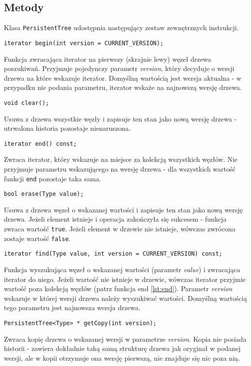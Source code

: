 \documentclass[a4paper,twoside]{article}
\begin{document}
	\subsection{Metody}
	Klasa \lstinline|PersistentTree| udostępnia następujący zestaw zewnętrznych instrukcji.
	\begin{lstlisting}[caption=begin]
iterator begin(int version = CURRENT_VERSION);
	\end{lstlisting}
	Funkcja zwracająca iterator na pierwszy (skrajnie lewy) węzeł drzewa poszukiwań. Przyjmuje pojedynczy parametr \textit{version}, który decyduje o wersji drzewa na które wskazuje iterator. Domyślną wartością jest wersja aktualna - w przypadku nie podania parametru, iterator wskaże na najnowszą wersję drzewa.
	\begin{lstlisting}[caption=clear]
void clear();
	\end{lstlisting}
	Usuwa z drzewa wszystkie węzły i zapisuje ten stan jako nową wersję drzewa - utrwalona historia pozostaje nienaruszona.
	\begin{lstlisting}[caption=end, label={lst:end}]
iterator end() const;
	\end{lstlisting}
	Zwraca iterator, który wskazuje na miejsce za kolekcją wszystkich węzłów. Nie przyjmuje parametru wskazującego na wersję drzewa - dla wszystkich wartość funkcji \lstinline|end| pozostaje taka sama.
	\begin{lstlisting}[caption=erase]
bool erase(Type value);
	\end{lstlisting}
	Usuwa z drzewa węzeł o wskazanej wartości i zapisuje ten stan jako nową wersję drzewa. Jeżeli element istnieje i operacja zakończyła się sukcesem - funkcja zwraca wartość \lstinline|true|. Jeżeli element w drzewie nie istnieje, wówczas zwrócona zostaje wartość \lstinline|false|.
	\begin{lstlisting}[caption=find]
iterator find(Type value, int version = CURRENT_VERSION) const;
	\end{lstlisting}
	Funkcja wyszukująca węzeł o wskazanej wartości (parametr \textit{value}) i zwracająca iterator do niego. Jeżeli wartość nie istnieje w drzewie, wówczas iterator przyjmie wartość poza kolekcją węzłów (patrz funkcja end \ref{lst:end}). Parametr \textit{version} wskazuje w której wersji drzewa należy wyszukiwać wartości. Domyślną wartością tego parametru jest najnowsza wersja drzewa.
	\begin{lstlisting}[caption=getCopy]
PersistentTree<Type> * getCopy(int version);
	\end{lstlisting}
	Zwraca kopię drzewa o wskazanej wersji w parametrze \textit{version}. Kopia nie posiada historii - zawiera dokładnie taką samą strukturę drzewa jak oryginał w podanej wersji, ale w kopii otrzymuje ona wersję pierwszą, nie znajduje się nic poza nią.
\end{document}
